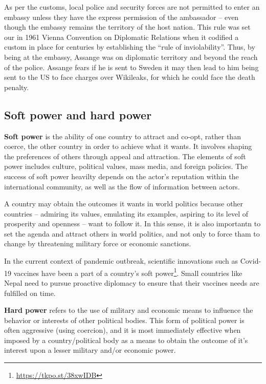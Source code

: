 \documentclass[
  openany]{book}
\begin{document}
As per the customs, local police and security forces are not permitted to enter an embassy unless they have the express permission of the ambassador -- even though the embassy remains the territory of the host nation. This rule was set our in 1961 Vienna Convention on Diplomatic Relations when it codified a custom in place for centuries by establishing the ``rule of inviolability''. Thus, by being at the embassy, Assange was on diplomatic territory and beyond the reach of the police. Assange fears if he is sent to Sweden it may then lead to him being sent to the US to face charges over Wikileaks, for which he could face the death penalty.

\hypertarget{soft-power-and-hard-power}{%
\subsection{Soft power and hard power}\label{soft-power-and-hard-power}}

\textbf{Soft power} is the ability of one country to attract and co-opt, rather than coerce, the other country in order to achieve what it wants. It involves shaping the preferences of others through appeal and attraction. The elements of soft power includes culture, political values, mass media, and foreign policies. The success of soft power heavilty depends on the actor's reputation within the international community, as well as the flow of information between actors.

A country may obtain the outcomes it wants in world politics because other countries -- admiring its values, emulating its examples, aspiring to its level of prosperity and openness -- want to follow it. In this sense, it is also importantn to set the agenda and attract others in world politics, and not only to force tham to change by threatening military force or economic sanctions.

In the current context of pandemic outbreak, scientific innovations such as Covid-19 vaccines have been a part of a country's soft power\footnote{\url{https://tkpo.st/38xwIDB}}. Small countries like Nepal need to pursue proactive diplomacy to ensure that their vaccines needs are fulfilled on time.

\textbf{Hard power} refers to the use of military and economic means to influence the behavior or interests of other political bodies. This form of political power is often aggressive (using coercion), and it is most immediately effective when imposed by a country/political body as a means to obtain the outcome of it's interest upon a lesser military and/or economic power.
\end{document}
